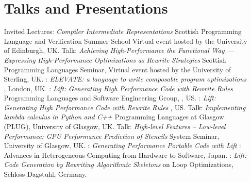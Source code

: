 \section{Talks and Presentations}
  {Invited Lectures: \emph{Compiler Intermediate Representations}\newline
  \small Scottish Programming Language and Verification Summer School\newline
  Virtual event hosted by the University of Edinburgh, UK.}
  {Talk: \emph{Achieving High-Performance the Functional Way — Expressing High-Performance Optimizations as Rewrite Strategies}\newline
  \small Scottish Programming Languages Seminar, Virtual event hosted by the University of Sterling, UK.}
  {: \emph{ ELEVATE: a language to write composable program optimizations}\newline
  \small {}, London, UK.}
  {: \emph{Lift: Generating High Performance Code with Rewrite Rules}\newline
  \small Programming Languages and Software Engineering Group, , US.}
  {: \emph{Lift: Generating High Performance Code with Rewrite Rules}\newline
    \small {}, US.}
         {Talk: \emph{Implementing lambda calculus in Python and C++}\newline
          \small Programming Languages at Glasgow (PLUG), University of Glasgow, UK.}
         {Talk: \emph{High-level Features – Low-level Performance: GPU Performance Prediction of Stencils}\newline
          \small System Seminar, University of Glasgow, UK.}
         {:
          \emph{Generating Performance Portable Code with Lift}\newline
         \small {}: Advances in Heterogeneous Computing from Hardware to Software, Japan.}
         {:
          \emph{Lift: Code Generation by Rewriting Algorithmic Skeletons}\newline
         \small {} on Loop Optimizations, Schloss Dagstuhl, Germany.}
